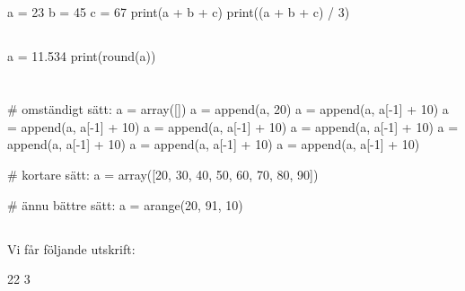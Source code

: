 \subsection*{}
\vspace{3pt}
\begin{python}
a = 23
b = 45
c = 67
print(a + b + c)
print((a + b + c) / 3)
\end{python}

\subsection*{}
\vspace{3pt}
\begin{python}
a = 11.534
print(round(a))
\end{python}

\section*{}

\subsection*{}
\vspace{3pt}
\begin{python}
# omständigt sätt:
a = array([])
a = append(a, 20)
a = append(a, a[-1] + 10)
a = append(a, a[-1] + 10)
a = append(a, a[-1] + 10)
a = append(a, a[-1] + 10)
a = append(a, a[-1] + 10)
a = append(a, a[-1] + 10)
a = append(a, a[-1] + 10)

# kortare sätt:
a = array([20, 30, 40, 50, 60, 70, 80, 90])

# ännu bättre sätt:
a = arange(20, 91, 10)
\end{python}

\subsection*{}
Vi får följande utskrift:
\vspace{10pt}
\begin{python}
22
3
\end{python}

\section*{}

